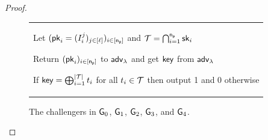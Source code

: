 \begin{proof}
\begin{figure}[h!]
\begin{center}
{\begin{tabular}{l}
\begin{minipage}[t]{0.9\textwidth}
	\item Let $(\mathsf{pk}_i = (I_{i}^{j})_{j \in [\ell]})_{i \in [\mathsf{n_p}]}$ and $\mathcal{T} = \bigcap_{i=1}^{\mathsf{n_p}}\mathsf{sk}_i$
	\item Return $(\mathsf{pk}_i)_{i \in [\mathsf{n_p}]}$ to ${\mathsf{adv}}_\lambda$ and get $\mathsf{key}$ from ${\mathsf{adv}}_\lambda$
	\item If $\mathsf{key} = \bigoplus_{i=1}^{|\mathcal{T}|}t_i$ for all $t_i \in \mathcal{T}$ then output 1 and 0 otherwise
	\end{minipage}
	\end{tabular}
}
\end{center}
\caption{The challengers in $\mathsf{G}_0$, $\mathsf{G}_1$, $\mathsf{G}_2$, $\mathsf{G}_3$, and $\mathsf{G}_4$.}
\label{fig:time-security-b1}
\end{figure}

\end{proof}
